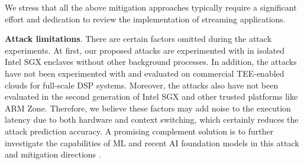 We stress that all the above mitigation approaches typically require a significant effort and dedication to review the implementation of streaming applications.

\vspace{0.1cm}
\noindent \textbf{Attack limitations}.
%
There are certain factors omitted during the attack experiments.
%
At first, our proposed attacks are experimented with in isolated Intel SGX enclaves without other background processes.
%
In addition, the attacks have not been experimented with and evaluated on commercial TEE-enabled clouds for full-scale DSP systems.
%
Moreover, the attacks also have not been evaluated in the second generation of Intel SGX and other trusted platforms like ARM Zone.
%
Therefore, we believe these factors may add noise to the execution latency due to both hardware and context switching, which certainly reduces the attack prediction accuracy.
%
A promising complement solution is to further investigate the capabilities of ML and recent AI foundation models in this attack and mitigation directions \cite{Umar25,Wu25}.
%
